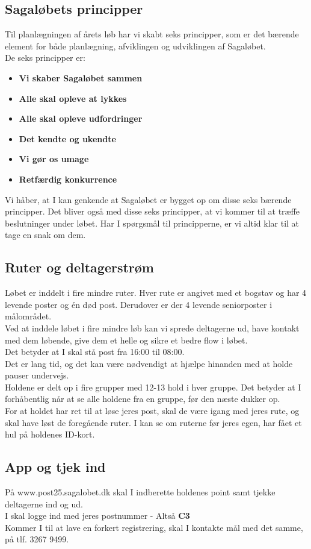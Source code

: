 \subsection{Sagaløbets principper}
Til planlægningen af årets løb har vi skabt seks principper, som er det bærende element for både planlægning, afviklingen og udviklingen af Sagaløbet.\\
De seks principper er:
\begin{itemize}
  \item \textbf{Vi skaber Sagaløbet sammen}
  \item \textbf{Alle skal opleve at lykkes}
  \item \textbf{Alle skal opleve udfordringer}
  \item \textbf{Det kendte og ukendte}
  \item \textbf{Vi gør os umage}
  \item \textbf{Retfærdig konkurrence}
\end{itemize}
Vi håber, at I kan genkende at Sagaløbet er bygget op om disse seks bærende principper. Det bliver også med disse seks principper, at vi kommer til at træffe beslutninger under løbet. Har I spørgsmål til principperne, er vi altid klar til at tage en snak om dem.
\subsection{Ruter og deltagerstrøm}
Løbet er inddelt i fire mindre ruter. Hver rute er angivet med et bogstav og har 4 levende poster og én død post. Derudover er der 4 levende seniorposter i målområdet.\\
Ved at inddele løbet i fire mindre løb kan vi sprede deltagerne ud, have kontakt med dem løbende, give dem et helle og sikre et bedre flow i løbet.\\
\newline
Det betyder at I skal stå post fra 16:00 til 08:00.\\
Det er lang tid, og det kan være nødvendigt at hjælpe hinanden med at holde pauser undervejs.\\
\newline
Holdene er delt op i fire grupper med 12-13 hold i hver gruppe. Det betyder at I forhåbentlig når at se alle holdene fra en gruppe, før den næste dukker op.\\
For at holdet har ret til at løse jeres post, skal de være igang med jeres rute, og skal have løst de foregående ruter. I kan se om ruterne før jeres egen, har fået et hul på holdenes ID-kort.
\subsection{App og tjek ind}
På www.post25.sagalobet.dk skal I indberette holdenes point samt tjekke deltagerne ind og ud.\\
I skal logge ind med jeres postnummer - Altså \textbf{C3}\\
\newline
Kommer I til at lave en forkert registrering, skal I kontakte mål med det samme, på tlf. 3267 9499.
\newpage
\vspace*{.4cm}

